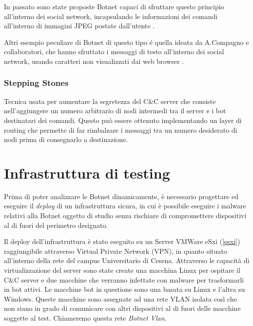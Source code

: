  In passato sono state proposte Botnet capaci di sfruttare questo principio all'interno dei social network, incapsulando le informazioni dei comandi all'interno di immagini JPEG postate dall'utente \cite{nagaraja2011stegobot}.

 Altri esempio peculiare di Botnet di questo tipo é quella ideata da A.Compagno e collaboratori, che hanno sfruttato i messaggi di testo all'interno dei social network, usando caratteri non visualizzati dai web browser \cite{nagaraja2011stegobot}.


 \subsection*{Stepping Stones}
 
 Tecnica usata per aumentare la segretezza del C\&C server che consiste nell'aggiungere un numero arbitrario di nodi intermedi tra il server e i bot destinatari dei comandi.  Questo può essere ottenuto implementando un layer di routing che permette di far rimbalzare i messaggi tra un numero desiderato di nodi prima di consegnarlo a destinazione.














 

\chapter{Infrastruttura di testing}
Prima di poter analizzare le Botnet dinamicamente, è necessario progettare ed eseguire il \textit{deploy} di un infrastruttura  sicura, in cui è possibile eseguire i malware relativi alla Botnet oggetto di studio senza rischiare di compromettere dispositivi al di fuori del perimetro designato.


Il deploy dell'infrastruttura è stato eseguito su un Server VMWare eSxi (\ref{esxi})  raggiungibile attraverso Virtual Private Network (VPN), in quanto situato all'interno della rete del campus Universitario di Cesena. Attraverso le capacità di virtualizzazione del server sono state create una macchina Linux per ospitare il C\&C server e due macchine che verranno infettate con malware per trasformarli in bot attivi. Le macchine bot in questione sono una basata su Linux e l'altra su Windows.  Queste macchine sono assegnate ad una rete VLAN isolata così che non siano in grado di comunicare con altri dispositivi al di fuori delle macchine soggette al test. Chiameremo questa rete \emph{Botnet Vlan}.

